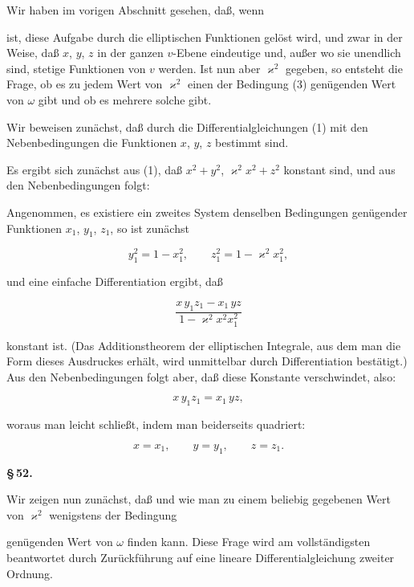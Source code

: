 
Wir haben im vorigen Abschnitt gesehen, daß, wenn


ist, diese Aufgabe durch die elliptischen Funktionen gelöst wird, und zwar in der Weise, daß $x$, $y$, $z$ in der ganzen $v$-Ebene eindeutige und, außer wo sie unendlich sind, stetige Funktionen von $v$ werden. Ist nun aber $\varkappa^2$ gegeben, so entsteht die Frage, ob es zu jedem Wert von $\varkappa^2$ einen der Bedingung (3) genügenden Wert von $\omega$ gibt und ob es mehrere solche gibt.

Wir beweisen zunächst, daß durch die Differentialgleichungen (1) mit den Nebenbedingungen die Funktionen $x$, $y$, $z$  bestimmt sind.

Es ergibt sich zunächst aus (1), daß $x^2+y^2$, $\varkappa^2x^2+z^2$ konstant sind, und aus den Nebenbedingungen folgt:


Angenommen, es existiere ein zweites System denselben Bedingungen genügender Funktionen $x_1$, $y_1$, $z_1$, so ist zunächst

\[
y_1^2 = 1-x_1^2, \qquad z_1^2 = 1-\varkappa^2x_1^2,
\]

und eine einfache Differentiation ergibt, daß

\[
\frac{x\,y_1z_1 - x_1\,yz}{1-\varkappa^2x^2x_1^2}
\]

konstant ist. (Das Additionstheorem der elliptischen Integrale, aus dem man die Form dieses Ausdruckes erhält, wird unmittelbar durch Differentiation bestätigt.) Aus den Nebenbedingungen folgt aber, daß diese Konstante verschwindet, also:

\[
x\,y_1z_1 = x_1\,yz,
\]

woraus man leicht schließt, indem man beiderseits quadriert:

\[
x = x_1, \qquad y=y_1, \qquad z=z_1.
\]

\begin{center}
\textbf{\S\,52. }
\end{center}

Wir zeigen nun zunächst, daß und wie man zu einem beliebig gegebenen Wert von $\varkappa^2$ wenigstens  der Bedingung


genügenden Wert von $\omega$ finden kann. Diese Frage wird am vollständigsten beantwortet durch Zurückführung auf eine lineare Differentialgleichung zweiter Ordnung.
